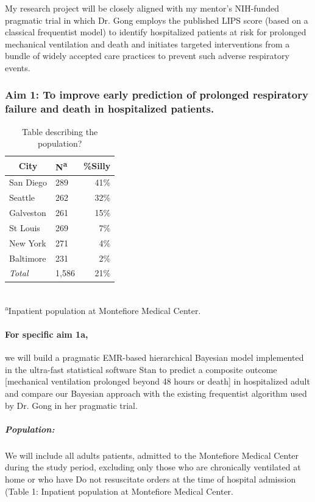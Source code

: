 \documentclass[11pt,notitlepage]{article}
\begin{document}
My research project will be closely aligned with my mentor's NIH-funded pragmatic trial in which Dr. Gong employs the published LIPS score \cite{Herridge_12594312} (based on a classical frequentist model) to identify hospitalized patients at risk for prolonged mechanical ventilation and death and initiates targeted interventions from a bundle of widely accepted care practices to prevent such adverse respiratory events.

\subsubsection*{Aim 1: To improve early prediction of prolonged respiratory failure and death in hospitalized patients.}

\begin{table} %
\caption{Table describing the population?}
\begin{center}
\begin{tabular}{l l r}
\toprule
\multicolumn{1}{c}{City} & {N\textsuperscript{a}} & {\%Silly}\\
\midrule
San Diego & 289 & 41\%\\
Seattle & 262 & 32\%\\
Galveston & 261 & 15\%\\
St Louis & 269 & 7\%\\
New York & 271 & 4\%\\
Baltimore & 231 & 2\%\\
\emph{Total} & 1,586 & 21\%\\
\hline
\end{tabular}\\
\footnotesize\textsuperscript{a}{Inpatient population at Montefiore Medical Center.}
\end{center}
\label{default}
\end{table}

\paragraph*{For specific aim 1a,} we will build a pragmatic EMR-based hierarchical Bayesian model implemented in the ultra-fast statistical software Stan to predict a composite outcome [mechanical ventilation prolonged beyond 48 hours or death] in hospitalized adult and compare our Bayesian approach with the existing frequentist algorithm used by Dr. Gong in her pragmatic trial.

\subparagraph*{Population:}
We will include all adults patients, admitted to the Montefiore Medical Center during the study period, excluding only those who are chronically ventilated at home or who have Do not resuscitate orders at the time of hospital admission (Table 1: Inpatient population at Montefiore Medical Center. 
\end{document}

